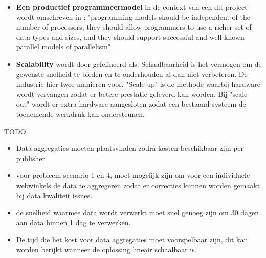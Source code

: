 \begin{itemize}
    \item \textbf{Een productief programmeermodel} in de context van een dit project wordt omschreven in \cite{asanovic2006landscape}: "programming models should be independent of the number of processors, they should allow programmers to use a richer set of data types and sizes, and they should support successful and well-known parallel models of parallelism"

    \item \textbf{Scalability} wordt door \cite{dubey2005recognition} gefefineerd als: Schaalbaarheid is het vermogen om de gewenste snelheid te bieden en te onderhouden al dan niet verbeteren. De industrie hier twee manieren voor. "Scale up" is de methode waarbij hardware wordt vervangen zodat er betere prestatie geleverd kan worden. Bij "scale out" wordt er extra hardware aangesloten zodat een bestaand systeem de toenemende werkdruk kan ondersteunen.
\end{itemize}

TODO
\begin{itemize}
    \item Data aggregaties moeten plaatsvinden zodra kosten beschikbaar zijn per publisher
    
    \item voor probleem scenario 1 en 4, moet mogelijk zijn om voor een individuele webwinkels de data te aggregeren zodat er correcties kunnen worden gemaakt bij data kwaliteit issues. 
    \item de snelheid waarmee data wordt verwerkt moet snel genoeg zijn om 30 dagen aan data binnen 1 dag te verwerken.
    
    \item De tijd die het kost voor data aggregaties moet voorspelbaar zijn, dit kan worden berijkt  wanneer de oplossing lineair schaalbaar is.
\end{itemize}

